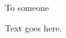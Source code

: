 \begin{dedication}

\null\vfil
\begin{center}

To someone\\\vspace{12pt}

Text goes here.

\end{center}
\vfil\null

\end{dedication}
